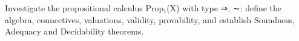 Investigate the propositional calculus Prop₁(X) with type {⇒, ∼}: define the algebra, connectives, valuations, validity, provability, and establish Soundness, Adequacy and Decidability theorems.
